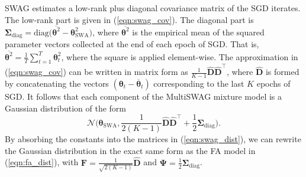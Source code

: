 \documentclass[a4paper,11pt]{article}
\newcommand{\matr}[1]{\mathbf{#1}}
\newcommand{\bgreek}[1]{\boldsymbol{#1}}
\begin{document}
SWAG estimates a low-rank plus diagonal covariance matrix of the SGD iterates. The low-rank part is given in (\ref{eqn:swag_cov}). The diagonal part is $\matr{\Sigma}_{\text{diag}} = \text{diag}\big(\overline{\bgreek{\theta}^2} - \bgreek{\theta}_{\text{SWA}}^2 \big)$, where $\overline{\bgreek{\theta}^2}$ is the empirical mean of the squared parameter vectors collected at the end of each epoch of SGD. That is, $\overline{\bgreek{\theta}^2} = \frac{1}{T}\sum_{t=1}^T \bgreek{\theta}_t^2$, where the square is applied element-wise. The approximation in (\ref{eqn:swag_cov}) can be written in matrix form as $\frac{1}{K-1} \matr{\hat{D}\hat{D}}^{\intercal}$, where $\matr{\hat{D}}$ is formed by concatenating the vectors $(\bgreek{\theta}_t - \overline{\bgreek{\theta}}_t)$ corresponding to the last $K$ epochs of SGD. It follows that each component of the MultiSWAG mixture model is a Gaussian distribution of the form
\begin{equation}\label{eqn:swag_dist}
	\mathcal{N}\Big(\bgreek{\theta}_{\text{SWA}}, \frac{1}{2(K-1)} \matr{\hat{D}\hat{D}}^{\intercal} + \frac{1}{2}\matr{\Sigma}_{\text{diag}}\Big).
\end{equation}
By absorbing the constants into the matrices in (\ref{eqn:swag_dist}), we can rewrite the Gaussian distribution in the exact same form as the FA model in (\ref{eqn:fa_dist}), with $\matr{F} = \frac{1}{\sqrt{2(K-1)}} \matr{\hat{D}}$ and $\matr{\Psi} = \frac{1}{2} \matr{\Sigma}_{\text{diag}}$.

\end{document}
